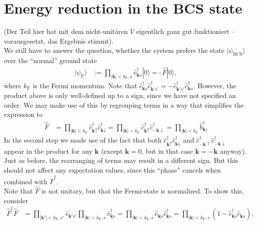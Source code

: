 \documentclass[english, parskip=full]{scrartcl}
\newcommand{\kla}{}
\newcommand{\tecxt}{}
\newcommand{\Ket}{}
\begin{document}
\section{Energy reduction in the BCS state}
(Der Teil hier hat mit dem nicht-unitären $V$ eigentlich ganz gut funktioniert -- vorausgesetzt, das Ergebnis stimmt).\\
We still have to answer the question, whether the system prefers the state $\Ket | \psi_\tecxt\text{BCS} \rangle$ over the ``normal'' ground state
\begin{align}
\Ket | \psi_\tecxt\text{F} \rangle &:= \prod_{|\textbf{k}| < k_\tecxt\text{F},s} \hat{c}_{\textbf{k}s}^\dagger \Ket | 0 \rangle =: \hat{F} \Ket | 0 \rangle,
\end{align}
where $k_\tecxt\text{F}$ is the Fermi momentum.
Note that $\hat{c}_{\textbf{k}s}^\dagger \hat{c}_{\textbf{k}'s'}^\dagger = - \hat{c}_{\textbf{k}'s'}^\dagger \hat{c}_{\textbf{k}s}^\dagger$.
However, the product above is only well-defined up to a sign, since we have not specified an order.
We may make use of this by regrouping terms in a way that simplifies the expression to
\begin{align}
\hat{F} &= \prod_{|\textbf{k}|<k_\tecxt\text{F}} \hat{c}_{\textbf{k}\uparrow}^\dagger \hat{c}_{\textbf{k}\downarrow}^\dagger = \prod_{|\textbf{k}|<k_\tecxt\text{F}} \hat{c}_{\textbf{k}\uparrow}^\dagger \hat{c}_{-\textbf{k}\downarrow}^\dagger = \prod_{|\textbf{k}|<k_\tecxt\text{F}} \hat{b}_\textbf{k}^\dagger.
\end{align}
In the second step we made use of the fact that both $\hat{c}_{\textbf{k}\uparrow}^\dagger \hat{c}_{\textbf{k}\downarrow}^\dagger$ and $\hat{c}_{-\textbf{k}\uparrow}^\dagger \hat{c}_{-\textbf{k}\downarrow}^\dagger$ appear in the product for any $\textbf{k}$ (except $\textbf{k}=0$, but in that case $\textbf{k}=-\textbf{k}$ anyway).
Just as before, the rearranging of terms may result in a different sign.
But this should not affect any expectation values, since this ``phase'' cancels when combined with $\hat{F}^\dagger$.
\\
Note that $\hat{F}$ is not unitary, but that the Fermi-state is normalized.
To show this, consider
\begin{align}
\hat{F}^\dagger\hat{F} &= \prod_{|\textbf{k}'|<k_\tecxt\text{F}, s'} \hat{c}_{\textbf{k}'s'} \prod_{|\textbf{k}|<k_\tecxt\text{F}, s} \hat{c}_{\textbf{k}s}^\dagger = \prod_{|\textbf{k}| < k_\tecxt\text{F}, s} \hat{c}_{\textbf{k}s} \hat{c}_{\textbf{k}s}^\dagger = \prod_{|\textbf{k}| < k_\tecxt\text{F}, s}  \kla\left( 1 - \hat{c}_{\textbf{k}s}^\dagger \hat{c}_{\textbf{k}s}  \right) ,
\end{align}
\end{document}
